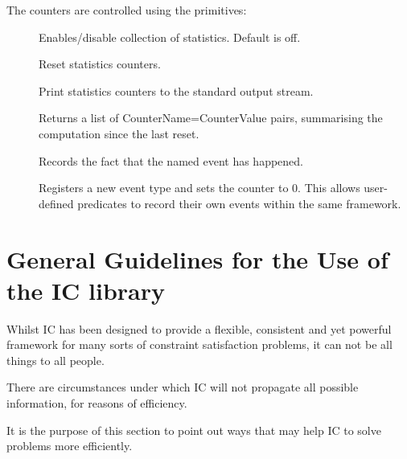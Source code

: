 The counters are controlled using the primitives:
\begin{description}
\item[]
\item[]
Enables/disable collection of statistics.  Default is off.

\item[]
Reset statistics counters.

\item[]
Print statistics counters to the standard output stream.

\item[]
Returns a list of CounterName=CounterValue pairs, summarising the
computation since the last reset.

\item[]
Records the fact that the named event has happened.

\item[]
Registers a new event type and sets the counter to 0.  This allows
user-defined predicates to record their own events within the same
framework.

\end{description}


\section{General Guidelines for the Use of the IC library}
Whilst IC has been designed to provide a flexible, consistent and yet
powerful framework for many sorts of constraint satisfaction
problems, it can not be all things to all people.

There are circumstances under which IC will not propagate all possible
information, for reasons of efficiency.

It is the purpose of this section to point out ways that may help IC
to solve problems more efficiently.

